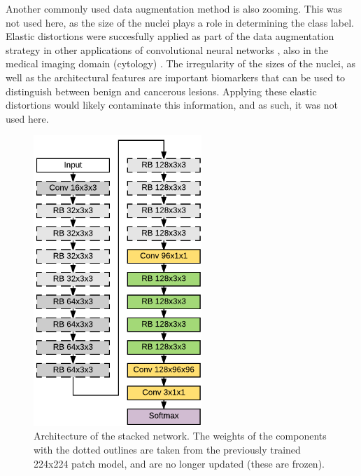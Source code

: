 \documentclass[journal]{IEEEtran}
\begin{document}
\medskip

Another commonly used data augmentation method is also zooming. This was not used here, as the size of the nuclei plays a role in determining the class label. Elastic distortions were succesfully applied as part of the data augmentation strategy in other applications of convolutional neural networks \cite{elastransforms}, also in the medical imaging domain (cytology) \cite{unet}. The irregularity of the sizes of the nuclei, as well as the architectural features are important biomarkers that can be used to distinguish between benign and cancerous lesions. Applying these elastic distortions would likely contaminate this information, and as such, it was not used here.




\begin{figure}[!t]
\centering{}
\includegraphics[width=2.5in]{architecture_stacked}
\caption{Architecture of the stacked network. The weights of the components with the dotted outlines are taken from the previously trained 224x224 patch model, and are no longer updated (these are frozen).}
\label{fig_stacked}
\end{figure}
\end{document}
